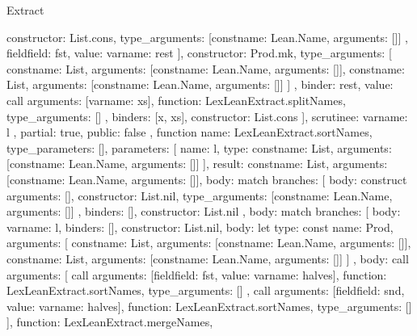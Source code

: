 \begin{lexlean}{Extract}
\begin{toolingmodule}
{{{{{{{                    constructor: List.cons,
                    type_arguments: [const{name: Lean.Name, arguments: []}]
                  },
                  field{field: fst, value: var{name: rest}}
                ],
                constructor: Prod.mk,
                type_arguments: [
                  const{name: List, arguments: [const{name: Lean.Name, arguments: []}]},
                  const{name: List, arguments: [const{name: Lean.Name, arguments: []}]}
                ]
              },
              binder: rest,
              value: call{
                arguments: [var{name: xs}],
                function: LexLeanExtract.splitNames,
                type_arguments: []
              }
            },
            binders: [x, xs],
            constructor: List.cons
          }
        ],
        scrutinee: var{name: l}
      },
      partial: true,
      public: false
    },
    function{
      name: LexLeanExtract.sortNames,
      type_parameters: [],
      parameters: [
        {name: l, type: const{name: List, arguments: [const{name: Lean.Name, arguments: []}]}}
      ],
      result: const{name: List, arguments: [const{name: Lean.Name, arguments: []}]},
      body: match{
        branches: [
          {
            body: construct{
              arguments: [],
              constructor: List.nil,
              type_arguments: [const{name: Lean.Name, arguments: []}]
            },
            binders: [],
            constructor: List.nil
          },
          {
            body: match{
              branches: [
                {body: var{name: l}, binders: [], constructor: List.nil},
                {
                  body: let{
                    type: const{
                      name: Prod,
                      arguments: [
                        const{name: List, arguments: [const{name: Lean.Name, arguments: []}]},
                        const{name: List, arguments: [const{name: Lean.Name, arguments: []}]}
                      ]
                    },
                    body: call{
                      arguments: [
                        call{
                          arguments: [field{field: fst, value: var{name: halves}}],
                          function: LexLeanExtract.sortNames,
                          type_arguments: []
                        },
                        call{
                          arguments: [field{field: snd, value: var{name: halves}}],
                          function: LexLeanExtract.sortNames,
                          type_arguments: []
                        }
                      ],
                      function: LexLeanExtract.mergeNames,
}}}}}}}}
\end{toolingmodule}
\end{lexlean}
